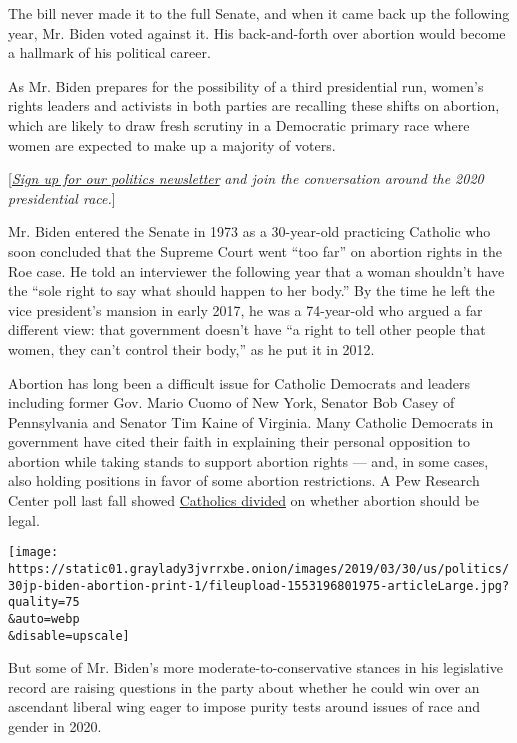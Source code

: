 The bill never made it to the full Senate, and when it came back up the
following year, Mr. Biden voted against it. His back-and-forth over
abortion would become a hallmark of his political career.

As Mr. Biden prepares for the possibility of a third presidential run,
women's rights leaders and activists in both parties are recalling these
shifts on abortion, which are likely to draw fresh scrutiny in a
Democratic primary race where women are expected to make up a majority
of voters.

{[}\href{https://www.nytimes3xbfgragh.onion/newsletters/politics?smid=rd?action=click\&module=Intentional\&pgtype=Article}{\emph{Sign
up for our politics newsletter}} \emph{and join the conversation around
the 2020 presidential race.}{]}

Mr. Biden entered the Senate in 1973 as a 30-year-old practicing
Catholic who soon concluded that the Supreme Court went ``too far'' on
abortion rights in the Roe case. He told an interviewer the following
year that a woman shouldn't have the ``sole right to say what should
happen to her body.'' By the time he left the vice president's mansion
in early 2017, he was a 74-year-old who argued a far different view:
that government doesn't have ``a right to tell other people that women,
they can't control their body,'' as he put it in 2012.

Abortion has long been a difficult issue for Catholic Democrats and
leaders including former Gov. Mario Cuomo of New York, Senator Bob Casey
of Pennsylvania and Senator Tim Kaine of Virginia. Many Catholic
Democrats in government have cited their faith in explaining their
personal opposition to abortion while taking stands to support abortion
rights --- and, in some cases, also holding positions in favor of some
abortion restrictions. A Pew Research Center poll last fall showed
\href{https://www.pewforum.org/fact-sheet/public-opinion-on-abortion/}{Catholics
divided} on whether abortion should be legal.

\texttt{[image: https://static01.graylady3jvrrxbe.onion/images/2019/03/30/us/politics/30jp-biden-abortion-print-1/fileupload-1553196801975-articleLarge.jpg?quality=75\\\&auto=webp\\\&disable=upscale]}

But some of Mr. Biden's more moderate-to-conservative stances in his
legislative record are raising questions in the party about whether he
could win over an ascendant liberal wing eager to impose purity tests
around issues of race and gender in 2020.

